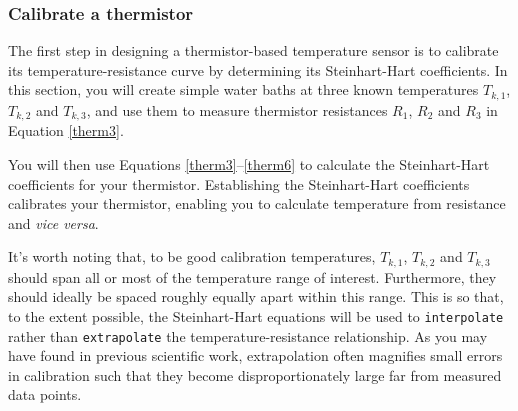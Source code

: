 
\subsubsection{\howto Calibrate a thermistor}
The first step in designing a thermistor-based temperature sensor is to calibrate its temperature-resistance curve by determining its Steinhart-Hart coefficients.
In this section, you will create simple water baths at three known temperatures $T_{k,1}$, $T_{k,2}$ and $T_{k,3}$, and use them to measure thermistor resistances $R_1$, $R_2$ and $R_3$ in Equation \ref{therm3}.

You will then use Equations \ref{therm3}--\ref{therm6} to calculate the Steinhart-Hart coefficients for your thermistor.
Establishing the Steinhart-Hart coefficients calibrates your thermistor, enabling you to calculate temperature from resistance and \textit{vice versa}.

It's worth noting that, to be good calibration temperatures, $T_{k,1}$, $T_{k,2}$ and $T_{k,3}$ should span all or most of the temperature range of interest.
Furthermore, they should ideally be spaced roughly equally apart within this range.
This is so that, to the extent possible, the Steinhart-Hart equations will be used to \texttt{interpolate} rather than \texttt{extrapolate} the temperature-resistance relationship. 
As you may have found in previous scientific work, extrapolation often magnifies small errors in calibration such that they become disproportionately large far from measured data points. 

